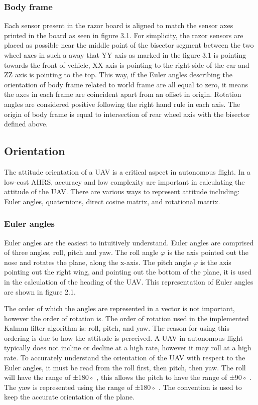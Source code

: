\subsubsection{Body frame}
Each sensor present in the razor board is aligned to match the sensor axes printed in the board as
seen in figure 3.1. For simplicity, the razor sensors are placed as possible near the middle point of the
bisector segment between the two wheel axes in such a away that YY axis as marked in the figure 3.1
is pointing towards the front of vehicle, XX axis is pointing to the right side of the car and ZZ axis is
pointing to the top. This way, if the Euler angles describing the orientation of body frame related to world
frame are all equal to zero, it means the axes in each frame are coincident apart from an offset in origin.
Rotation angles are considered positive following the right hand rule in each axis. The origin of body
frame is equal to intersection of rear wheel axis with the bisector defined above.
\subsection{Orientation}
The attitude orientation of a UAV is a critical aspect in autonomous flight. In a low-cost
AHRS, accuracy and low complexity are important in calculating the attitude of the UAV.
There are various ways to represent attitude including: Euler angles, quaternions, direct
cosine matrix, and rotational matrix.
\subsubsection{Euler angles}
Euler angles are the easiest to intuitively understand. Euler angles are comprised of three
angles, roll, pitch and yaw. The roll angle $\varphi$  is the axis pointed out the nose and rotates
the plane, along the x-axis. The pitch angle $\varphi$ is the axis pointing out the right wing, and
pointing out the bottom of the plane, it is used in the calculation of the heading of the UAV.
This representation of Euler angles are shown in figure 2.1.

The order of which the angles are represented in a vector is not important, however the
order of rotation is. The order of rotation used in the implemented Kalman filter algorithm is: roll, pitch, and yaw. The reason for using this ordering is due to how the attitude is
perceived. A UAV in autonomous flight typically does not incline or decline at a high rate,
however it may roll at a high rate. To accurately understand the orientation of the UAV
with respect to the Euler angles, it must be read from the roll first, then pitch, then yaw.
The roll will have the range of ±180◦
, this allows the pitch to have the range of ±90◦
. The
yaw is represented using the range of ±180◦
. The convention is used to keep the accurate
orientation of the plane.


